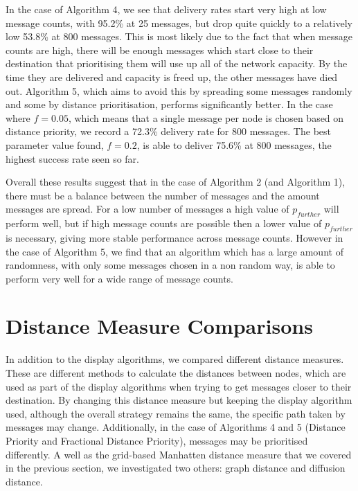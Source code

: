\documentclass[bsc,frontabs,twoside,singlespacing,parskip,deptreport]{infthesis}     %
\begin{document}
In the case of Algorithm 4, we see that delivery rates start very high at low message counts, with 95.2\% at 25 messages, but drop quite quickly to a relatively low 53.8\% at 800 messages. This is most likely due to the fact that when message counts are high, there will be enough messages which start close to their destination that prioritising them will use up all of the network capacity. By the time they are delivered and capacity is freed up, the other messages have died out. Algorithm 5, which aims to avoid this by spreading some messages randomly and some by distance prioritisation, performs significantly better. In the case where $f=0.05$, which means that a single message per node is chosen based on distance priority, we record a 72.3\% delivery rate for 800 messages. The best parameter value found, $f=0.2$, is able to deliver 75.6\% at 800 messages, the highest success rate seen so far.

Overall these results suggest that in the case of Algorithm 2 (and Algorithm 1), there must be a balance between the number of messages and the amount messages are spread. For a low number of messages a high value of $p_{further}$ will perform well, but if high message counts are possible then a lower value of $p_{further}$ is necessary, giving more stable performance across message counts. However in the case of Algorithm 5, we find that an algorithm which has a large amount of randomness, with only some messages chosen in a non random way, is able to perform very well for a wide range of message counts.

\section{Distance Measure Comparisons} \label{sec:distance_measure_comparisons}
In addition to the display algorithms, we compared different distance measures. These are different methods to calculate the distances between nodes, which are used as part of the display algorithms when trying to get messages closer to their destination. By changing this distance measure but keeping the display algorithm used, although the overall strategy remains the same, the specific path taken by messages may change. Additionally, in the case of Algorithms 4 and 5 (Distance Priority and Fractional Distance Priority), messages may be prioritised differently. A well as the grid-based Manhatten distance measure that we covered in the previous section, we investigated two others: graph distance and diffusion distance.
\end{document}
